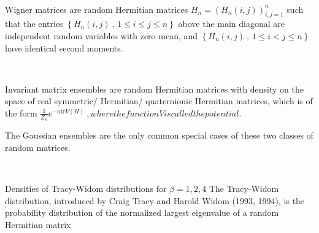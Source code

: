 \

Wigner matrices are random Hermitian matrices 
$ \textstyle H_n = (H_n(i,j))_{i,j=1}^n$  such that the entries
$ \left\{ H_n(i, j)~, \, 1 \leq i \leq j \leq n \right\} $
above the main diagonal are independent random variables with zero mean, and
$ \left\{ H_n(i, j)~, \, 1 \leq i < j \leq n \right\} $
have identical second moments.

\

Invariant matrix  ensembles are  random Hermitian matrices  with density  on the
space of real symmetric/ Hermitian/ quaternionic Hermitian matrices, which is of
the form $\textstyle \frac{1}{Z_n} e^{- n \mathrm{tr} V(H)}~, where the function
V is called the potential$.

The Gaussian ensembles are the only common special cases of these two classes of random matrices.

\


Densities of Tracy-Widom distributions for $\beta = 1, 2, 4$
The Tracy-Widom distribution, introduced by Craig Tracy and Harold Widom (1993, 1994), is the probability distribution of the normalized largest eigenvalue of a random Hermitian matrix
